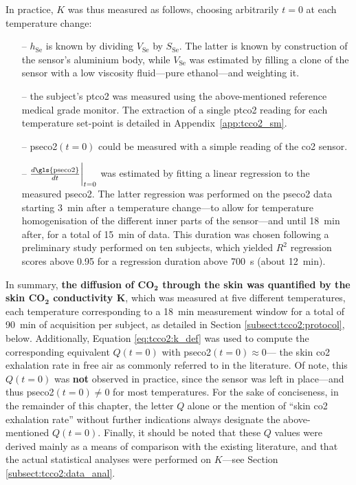 In practice, $K$ was thus measured as follows, choosing arbitrarily $t=0$ at each temperature change:
\begin{itemize}
	\item[--] $h_\text{Se}$ is known by dividing $V_\text{Se}$ by $S_\text{Se}$. The latter is known by construction of the sensor's aluminium body, while $V_\text{Se}$ was estimated by filling a clone of the sensor with a low viscosity fluid---pure ethanol---and weighting it.
	\item[--] the subject's \gls{ptco2} was measured using the above-mentioned reference medical grade monitor. The extraction of a single \gls{ptco2} reading for each temperature set-point is detailed in Appendix~\ref{app:tcco2_sm}.
	\item[--] \gls{pseco2}$(t=0)$ could be measured with a simple reading of the \gls{co2} sensor.
	\item[--] $\frac{d\text{\gls{pseco2}}}{dt} \biggr\rvert_{t=0}$ was estimated by fitting a linear regression to the measured \gls{pseco2}. The latter regression was performed on the \gls{pseco2} data starting 3~min after a temperature change---to allow for temperature homogenisation of the different inner parts of the sensor---and until 18~min after, for a total of 15~min of data. This duration was chosen following a preliminary study performed on ten subjects, which yielded $R^2$ regression scores above 0.95 for a regression duration above 700~s (about 12~min).
\end{itemize}

In summary, \textbf{the diffusion of $\mathbf{CO_2}$ through the skin was quantified by the skin $\mathbf{CO_2}$ conductivity $\boldsymbol{K}$}, which was measured at five different temperatures, each temperature corresponding to a 18~min measurement window for a total of 90~min of acquisition per subject, as detailed in Section \ref{subsect:tcco2:protocol}, below. Additionally, Equation \ref{eq:tcco2:k_def} was used to compute the corresponding equivalent $Q(t=0)$ with \gls{pseco2}$(t=0)\approx 0$---\ie{} the skin \gls{co2} exhalation rate in free air as commonly referred to in the literature. Of note, this $Q(t=0)$ was \textbf{not} observed in practice, since the sensor was left in place---and thus \gls{pseco2}$(t=0)\neq 0$ for most temperatures. For the sake of conciseness, in the remainder of this chapter, the letter $Q$ alone or the mention of \enquote{skin \gls{co2} exhalation rate} without further indications always designate the above-mentioned $Q(t=0)$. Finally, it should be noted that these $Q$ values were derived mainly as a means of comparison with the existing literature, and that the actual statistical analyses were performed on $K$---see Section \ref{subsect:tcco2:data_anal}.

